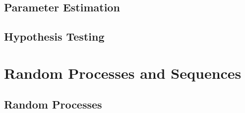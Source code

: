 \documentclass{amro-notes}
\begin{document}
\chapter{Parameter Estimation}


\chapter{Hypothesis Testing}


\part{Random Processes and Sequences}
\chapter{Random Processes}


\begin{appendices}
    
\end{appendices}





\end{document}
